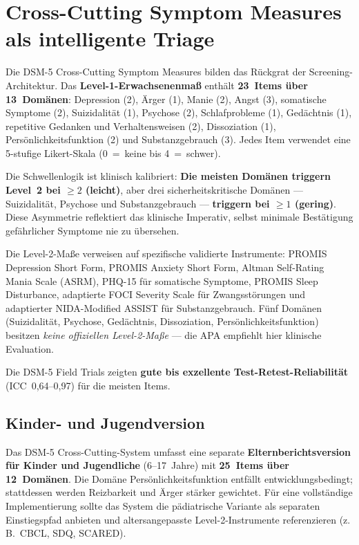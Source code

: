 \documentclass[11pt,a4paper]{article}
\begin{document}
\section{Cross-Cutting Symptom Measures als intelligente Triage}
\label{sec:screening}

Die DSM-5 Cross-Cutting Symptom Measures bilden das R\"uckgrat der Screening-Architektur. Das \textbf{Level-1-Erwachsenenma\ss{}} enth\"alt \textbf{23~Items \"uber 13~Dom\"anen}: Depression (2), \"Arger (1), Manie (2), Angst (3), somatische Symptome (2), Suizidalit\"at (1), Psychose (2), Schlafprobleme (1), Ged\"achtnis (1), repetitive Gedanken und Verhaltensweisen (2), Dissoziation (1), Pers\"onlichkeitsfunktion (2) und Substanzgebrauch (3). Jedes Item verwendet eine 5-stufige Likert-Skala (0~=~keine bis 4~=~schwer).

Die Schwellenlogik ist klinisch kalibriert: \textbf{Die meisten Dom\"anen triggern Level~2 bei $\geq 2$ (leicht)}, aber drei sicherheitskritische Dom\"anen --- Suizidalit\"at, Psychose und Substanzgebrauch --- \textbf{triggern bei $\geq 1$ (gering)}. Diese Asymmetrie reflektiert das klinische Imperativ, selbst minimale Best\"atigung gef\"ahrlicher Symptome nie zu \"ubersehen.

Die Level-2-Ma\ss{}e verweisen auf spezifische validierte Instrumente: PROMIS Depression Short Form, PROMIS Anxiety Short Form, Altman Self-Rating Mania Scale (ASRM), PHQ-15 f\"ur somatische Symptome, PROMIS Sleep Disturbance, adaptierte FOCI Severity Scale f\"ur Zwangsst\"orungen und adaptierter NIDA-Modified ASSIST f\"ur Substanzgebrauch. F\"unf Dom\"anen (Suizidalit\"at, Psychose, Ged\"achtnis, Dissoziation, Pers\"onlichkeitsfunktion) besitzen \textit{keine offiziellen Level-2-Ma\ss{}e} --- die APA empfiehlt hier klinische Evaluation.

Die DSM-5 Field Trials \citep{Narrow2013FieldTrials} zeigten \textbf{gute bis exzellente Test-Retest-Reliabilit\"at} (ICC~0,64--0,97) f\"ur die meisten Items.

\subsection{Kinder- und Jugendversion}

Das DSM-5 Cross-Cutting-System umfasst eine separate \textbf{Elternberichtsversion f\"ur Kinder und Jugendliche} (6--17~Jahre) mit \textbf{25~Items \"uber 12~Dom\"anen}. Die Dom\"ane \glqq Pers\"onlichkeitsfunktion\grqq{} entf\"allt entwicklungsbedingt; stattdessen werden Reizbarkeit und \"Arger st\"arker gewichtet. F\"ur eine vollst\"andige Implementierung sollte das System die p\"adiatrische Variante als separaten Einstiegspfad anbieten und altersangepasste Level-2-Instrumente referenzieren (z.\,B.\ CBCL, SDQ, SCARED).
\end{document}
